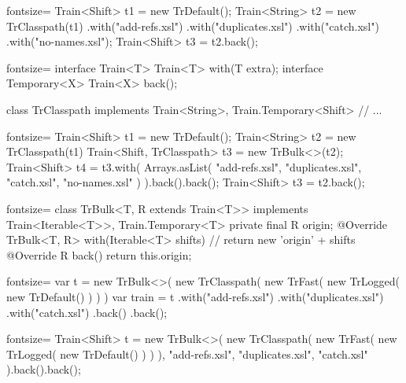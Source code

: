 \documentclass{article}
\begin{document}
\plush{}
\begin{pptWide}{2}
\begin{ffcode*}{fontsize=\footnotesize}
Train<Shift> t1 = new TrDefault();
Train<String> t2 = new TrClasspath(t1)
  .with("add-refs.xsl")
  .with("duplicates.xsl")
  .with("catch.xsl")
  .with("no-names.xsl");
Train<Shift> t3 = t2.back();
\end{ffcode*}
\columnbreak
\begin{ffcode*}{fontsize=\small}
interface Train<T> {
  Train<T> with(T extra);
  interface Temporary<X> {
    Train<X> back();
  }
}

class TrClasspath implements
  Train<String>,
  Train.Temporary<Shift> {
  // ...
}
\end{ffcode*}
\end{pptWide}

\plush{}
\begin{pptWide}{2}
\begin{ffcode*}{fontsize=\footnotesize}
Train<Shift> t1 = new TrDefault();
Train<String> t2 = new TrClasspath(t1)
Train<Shift, TrClasspath> t3 =
  new TrBulk<>(t2);
Train<Shift> t4 = t3.with(
  Arrays.asList(
    "add-refs.xsl",
    "duplicates.xsl",
    "catch.xsl",
    "no-names.xsl"
  )
).back().back();
Train<Shift> t3 = t2.back();
\end{ffcode*}
\columnbreak
\begin{ffcode*}{fontsize=\small}
class TrBulk<T, R extends Train<T>>
  implements Train<Iterable<T>>,
  Train.Temporary<T> {
  private final R origin;
  @Override
  TrBulk<T, R> with(Iterable<T> shifts) {
    // return new 'origin' + shifts
  }
  @Override
  R back() {
    return this.origin;
  }
}
\end{ffcode*}
\end{pptWide}

\plush{}
\begin{pptWide}{2}
\begin{ffcode*}{fontsize=\footnotesize}
var t = new TrBulk<>(
  new TrClasspath(
    new TrFast(
      new TrLogged(
        new TrDefault()
      )
    )
)
var train = t
  .with("add-refs.xsl")
  .with("duplicates.xsl")
  .with("catch.xsl")
  .back()
  .back();
\end{ffcode*}
\columnbreak
\begin{ffcode*}{fontsize=\small}
Train<Shift> t = new TrBulk<>(
  new TrClasspath(
    new TrFast(
      new TrLogged(
        new TrDefault()
      )
    )
  ),
  "add-refs.xsl",
  "duplicates.xsl",
  "catch.xsl"
).back().back();
\end{ffcode*}
\end{pptWide}
\end{document}

